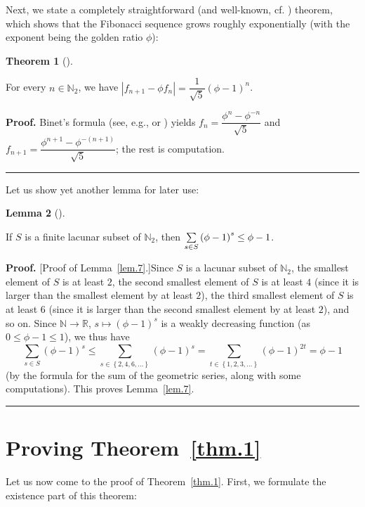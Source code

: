 \documentclass[numbers=enddot,12pt,final,onecolumn,notitlepage]{scrartcl}%
\numberwithin{exer}{section}
\theoremstyle{definition}
\newtheorem{theo}{Theorem}[section]
\newenvironment{theorem}[1][]
{\begin{theo}[#1]\begin{leftbar}}
{\end{leftbar}\end{theo}}
\newtheorem{lem}[theo]{Lemma}
\newenvironment{lemma}[1][]
{\begin{lem}[#1]\begin{leftbar}}
{\end{leftbar}\end{lem}}
\newenvironment{proof}[1][Proof]{\noindent\textbf{#1.} }{\ \rule{0.5em}{0.5em}}
\let\sumnonlimits\sum
\renewcommand{\sum}{\sumnonlimits\limits}
\begin{document}
Next, we state a completely straightforward (and well-known, cf. \cite[Chapter
9, Corollary 34]{BenQui03}) theorem, which shows that the Fibonacci sequence
grows roughly exponentially (with the exponent being the golden ratio $\phi$):

\begin{theorem}
\label{thm.6} For every $n\in\mathbb{N}_{2}$, we have $\left\vert f_{n+1}-\phi
f_{n}\right\vert =\dfrac{1}{\sqrt{5}}\left(  \phi-1\right)  ^{n}$.
\end{theorem}

\begin{proof}
Binet's formula (see, e.g., \cite[Identity 240]{BenQui03} or \cite[(1.20)]%
{Vorobi02}) yields $f_{n}=\dfrac{\phi^{n}-\phi^{-n}}{\sqrt{5}}$ and
$f_{n+1}=\dfrac{\phi^{n+1}-\phi^{-\left(  n+1\right)  }}{\sqrt{5}}$; the rest
is computation.
\end{proof}

Let us show yet another lemma for later use:

\begin{lemma}
\label{lem.7} If $S$ is a finite lacunar subset of $\mathbb{N}_{2}$, then
$\sum\limits_{s\in S}\left(  \phi-1\right)  ^{s}\leq\phi-1$.
\end{lemma}

\begin{proof}
[Proof of Lemma~\ref{lem.7}.]Since $S$ is a lacunar subset of $\mathbb{N}_{2}%
$, the smallest element of $S$ is at least $2$, the second smallest element of
$S$ is at least $4$ (since it is larger than the smallest element by at least
$2$), the third smallest element of $S$ is at least $6$ (since it is larger
than the second smallest element by at least $2$), and so on. Since
$\mathbb{N}\rightarrow\mathbb{R}$, $s\mapsto\left(  \phi-1\right)  ^{s}$ is a
weakly decreasing function (as $0\leq\phi-1\leq1$), we thus have%
\[
\sum_{s\in S}\left(  \phi-1\right)  ^{s}\leq\sum_{s\in\left\{  2,4,6,\ldots
\right\}  }\left(  \phi-1\right)  ^{s}=\sum_{t\in\left\{  1,2,3,\ldots
\right\}  }\left(  \phi-1\right)  ^{2t}=\phi-1
\]
(by the formula for the sum of the geometric series, along with some
computations). This proves Lemma~\ref{lem.7}.
\end{proof}

\section{Proving Theorem~\ref{thm.1}}

Let us now come to the proof of Theorem~\ref{thm.1}. First, we formulate the
existence part of this theorem:
\end{document}
